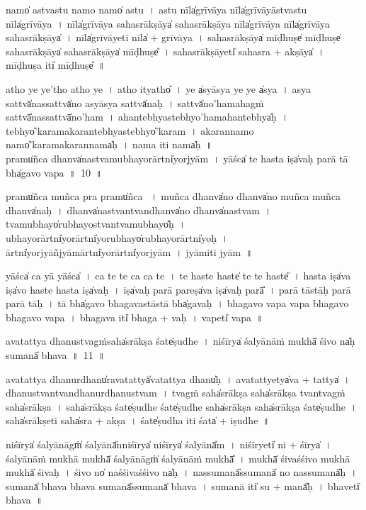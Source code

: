 \documentclass[parskip, DIV=14]{scrartcl}
\begin{document}
{namo̍ astvastu॒ namo॒ namo̍ astu~।
a॒stu॒ nīla̍grīvāya॒  nīla̍grīvāyāstvastu॒ nīla̍grīvāya~।
nīla̍grīvāya sahasrā॒kṣāya̍ sahasrā॒kṣāya॒ nīla̍grīvāya॒ nīla̍grīvāya sahasrā॒kṣāya̍~।
nīla̍grīvā॒yeti॒ nīla̍ + grī॒vā॒ya॒~।
sa॒ha॒srā॒kṣāya̍ mī॒ḍhuṣe̍ mī॒ḍhuṣe̍ sahasrā॒kṣāya̍ sahasrā॒kṣāya̍ mī॒ḍhuṣe̎~।
sa॒ha॒srā॒kṣāyeti̍ sahasra + a॒kṣāya̍~।
mī॒ḍhuṣa॒ iti̍ mī॒ḍhuṣe̎~॥ 

atho॒ ye ye'tho॒ atho॒ ye~।
atho॒ ityatho̎~।
ye a̍syāsya॒ ye ye a̍sya~।
a॒sya॒ sattvā̍na॒ssattvā̍no asyāsya॒ sattvā̍naḥ~।
sattvā̍no॒'hama॒hagṁ sattvā̍na॒ssattvā̍no॒'ham~।
ahantebhya॒stebhyo॒'hama॒hantebhya̍ḥ~।
tebhyo̍'karamakara॒ntebhya॒stebhyo̍'karam~।
a॒ka॒ra॒nnamo॒ namo̍'karamakara॒nnama̍ḥ~।
nama॒ iti॒ nama̍ḥ~॥ \\

\vspace{0.5cm}
pramu̍ñca॒ dhanva̍na॒stvamu॒bhayo॒rārtni̍yo॒rjyām~।
yāśca̍ te॒ hasta॒ iṣa̍vaḥ parā॒ tā bha̍gavo vapa~॥~10~॥

pramu̍ñca muñca॒ pra pramu̍ñca ~।
mu॒ñca॒ dhanva̍no॒ dhanva̍no muñca muñca॒ dhanva̍naḥ~।
dhanva̍na॒stvantvandhanva̍no॒ dhanva̍na॒stvam~।
tvamu॒bhayo̍ru॒bhayo॒stvantvamu॒bhayo̎ḥ~।
u॒bhayo॒rārtni̍yo॒rārtni̍yoru॒bhayo̍ru॒bhayo॒rārtni̍yoḥ~।
ārtni̍yo॒rjyāñjyāmārtni̍yo॒rārtni̍yo॒rjyām~।
jyāmiti॒  jyām~॥ 

yāśca̍ ca॒ yā yāśca̍~।
ca॒ te॒ te॒ ca॒ ca॒ te॒~।
te॒ haste॒ haste̍ te te॒ haste̎~।
hasta॒ iṣa̍va॒ iṣa̍vo॒ haste॒ hasta॒ iṣa̍vaḥ~।
iṣa̍va॒ḥ parā॒ pareṣa̍va॒ iṣa̍va॒ḥ parā̎~।
parā॒ tāstāḥ parā॒ parā॒ tāḥ~।
tā bha̍gavo bhagava॒stāstā bha̍gavaḥ~।
bha॒ga॒vo॒ va॒pa॒ va॒pa॒ bha॒ga॒vo॒ bha॒ga॒vo॒ va॒pa॒~।
bha॒ga॒va॒ iti̍ bhaga + va॒ḥ~।
va॒peti̍  vapa~॥ 

\vspace{0.5cm}
a॒va॒tattya॒ dhanu॒stvagṁsaha̍srākṣa॒ śate̍ṣudhe~।
ni॒śīrya̍ śa॒lyānā॒ṁ mukhā̍ śi॒vo na̍ḥ su॒manā̍ bhava~॥~11~॥

a॒va॒tattya॒ dhanu॒rdhanu̍rava॒tattyā̍va॒tattya॒ dhanu̍ḥ~।
a॒va॒tattyetya̍va + tattya̍~।
dhanu॒stvantvandhanu॒rdhanu॒stvam~।
tvagṁ saha̍srākṣa॒ saha̍srākṣa॒ tvantvagṁ saha̍srākṣa~।
saha̍srākṣa॒ śate̍ṣudhe॒ śate̍ṣudhe॒ saha̍srākṣa॒ saha̍srākṣa॒ śate̍ṣudhe~।
saha̍srā॒kṣeti॒ saha̍sra + a॒kṣa॒~।
śate̍ṣudha॒ iti॒ śata̍ + i॒ṣu॒dhe॒~॥ 

ni॒śīrya̍ śa॒lyānāgṁ̍ śa॒lyānā̎nni॒śīrya̍ ni॒śīrya̍ śa॒lyānā̎m~।
ni॒śīryeti̍ ni + śīrya̍~।
śa॒lyānā॒ṁ mukhā॒ mukhā̍  śa॒lyānāgṁ̍ śa॒lyānā॒ṁ mukhā̎~।
mukhā̍ śi॒vaśśi॒vo mukhā॒ mukhā̍ śi॒vaḥ~।
śi॒vo no̍ naśśi॒vaśśi॒vo na̍ḥ~।
na॒ssu॒manā̎ssu॒manā̍ no nassu॒manā̎ḥ~।
su॒manā̍ bhava bhava su॒manā̎ssu॒manā̍ bhava~।
su॒manā॒ iti̍ su + manā̎ḥ~।
bha॒veti̍ bhava~॥ 

}
\end{document}
